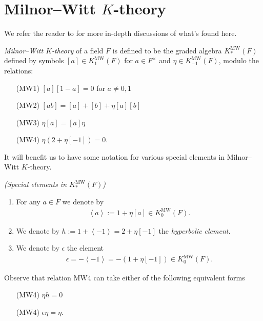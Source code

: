 \documentclass[11pt,openany]{book}
\providecommand{\MW}{\mathrm{MW}}
\begin{document}
\section{Milnor--Witt \texorpdfstring{$K$}{K}-theory} We refer the reader to \cite{Deglise,Carlier} for more in-depth discussions of what's found here.

\begin{definition}\label{def:MW} 
\textit{Milnor--Witt $K$-theory} of a field $F$ is defined to be the graded algebra $K_\ast^\MW(F)$ defined by symbols $[a]\in K_1^{\MW}(F)$ for $a\in F^\times$ and $\eta \in K_{-1}^\MW(F)$, modulo the relations:
\begin{enumerate}
    \item[(MW1)] $[a][1-a] = 0$ for $a\ne 0,1$
    \item[(MW2)] $[ab] = [a]+[b] + \eta[a][b]$
    \item[(MW3)] $\eta[a]=[a]\eta$
    \item[(MW4)] $\eta(2+\eta[-1]) = 0$.
\end{enumerate}
\end{definition}

It will benefit us to have some notation for various special elements in Milnor--Witt $K$-theory.

\begin{notation}\label{nota:special-elts-KMW} \textit{(Special elements in $K_\ast^\MW(F)$)}
\begin{enumerate}
    \item For any $a \in F$ we denote by
\begin{align*}
    \left\langle a \right\rangle := 1 + \eta[a] \in K_0^\MW(F).
\end{align*}
    \item We denote by $h := 1 + \left\langle -1 \right\rangle = 2 + \eta[-1]$ the \textit{hyperbolic element}.
    \item We denote by $\epsilon$ the element
    \begin{align*}
        \epsilon = - \left\langle -1 \right\rangle = -(1 + \eta[-1]) \in K_0^\MW(F).
    \end{align*}
\end{enumerate}
\end{notation}

\begin{remark} Observe that relation MW4 can take either of the following equivalent forms
\begin{enumerate}
    \item[(MW4)] $\eta h = 0$
    \item[(MW4)] $\epsilon \eta = \eta$.
\end{enumerate}
\end{remark}
\end{document}
